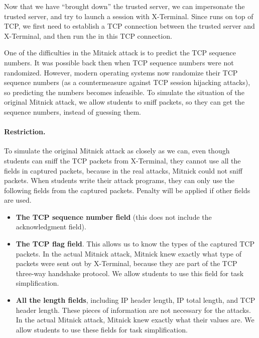Now that we have ``brought down'' the trusted server, we can impersonate the trusted
server, and try to launch a \rsh session  
with X-Terminal. Since \rsh runs on top of TCP, we first need to 
establish a TCP connection between the trusted server and X-Terminal,
and then run the \rsh in this TCP connection.  


One of the difficulties in the Mitnick attack is to predict the TCP sequence numbers. 
It was possible back then when TCP sequence numbers were not randomized. 
However, modern operating systems now randomize their TCP sequence numbers
(as a countermeasure against TCP session hijacking attacks), so
predicting the numbers becomes infeasible.
To simulate the situation of the original Mitnick attack, we 
allow students to sniff packets, so
they can get the sequence numbers, instead of guessing them.  

\paragraph{Restriction.} To simulate the original Mitnick attack
as closely as we can, even though students can sniff
the TCP packets from X-Terminal, they cannot use all the 
fields in captured packets, because in the real attacks,
Mitnick could not sniff packets. When students write their 
attack programs, they can only use the 
following fields from the captured packets. Penalty will be 
applied if other fields are used.

\begin{itemize}
\item \textbf{The TCP sequence number field} (this does not include the acknowledgment
field).

\item \textbf{The TCP flag field}. This allows us to know the types of the 
captured TCP packets. In the actual Mitnick attack, Mitnick knew
exactly what type of packets were sent out by X-Terminal, because 
they are part of the TCP three-way handshake protocol. 
We allow students to use this field for task simplification. 


\item \textbf{All the length fields}, including IP header length, IP total length,
and TCP header length. These pieces of information are not necessary 
for the attacks. In the actual Mitnick attack, Mitnick knew exactly what their
values are. We allow students to use these fields for task simplification. 
\end{itemize}


